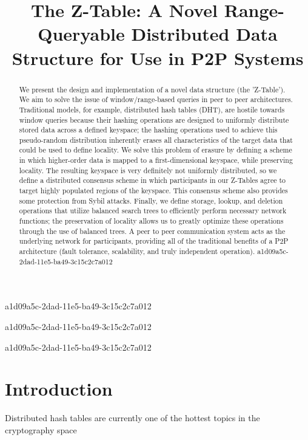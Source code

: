 \documentclass[12pt]{article}
\title{The Z-Table: A Novel Range-Queryable Distributed Data Structure for Use in P2P Systems}
\begin{document}
a1d09a5c-2dad-11e5-ba49-3c15c2c7a012
\maketitle

\begin{abstract}
We present the design and implementation of a novel data structure (the 'Z-Table'). We aim to solve the issue of window/range-based queries in peer to peer architectures. Traditional models, for example,  distributed hash tables (DHT), are hostile towards window queries because their hashing operations are designed to uniformly distribute stored data across a defined keyspace; the hashing operations used to achieve this pseudo-random distribution inherently erases all characteristics of the target data that could be used to define locality. We solve this problem of erasure by defining a scheme in which higher-order data is mapped to a first-dimensional keyspace, while preserving locality. The resulting keyspace is very definitely not uniformly distributed, so we define a distributed consensus scheme in which participants in our Z-Tables agree to target highly populated regions of the keyspace. This consensus scheme also provides some protection from Sybil attacks. Finally, we define storage, lookup, and deletion operations that utilize balanced search trees to efficiently perform necessary network functions; the preservation of locality allows us to greatly optimize these operations through the use of balanced trees. A peer to peer communication system acts as the underlying network for participants, providing all of the traditional benefits of a P2P architecture (fault tolerance, scalability, and truly independent operation).
a1d09a5c-2dad-11e5-ba49-3c15c2c7a012\end{abstract}
a1d09a5c-2dad-11e5-ba49-3c15c2c7a012

a1d09a5c-2dad-11e5-ba49-3c15c2c7a012\newpage
\section{Introduction}
Distributed hash tables are currently one of the hottest topics in the cryptography space~\cite{Stoica:2001dj,Rowstron:2001ea,Ratnasamy:2001wn}

\printbibliography
\end{document}
